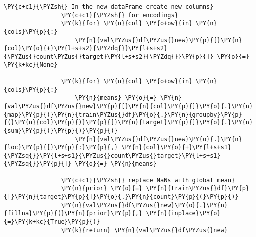 \begin{Verbatim}[commandchars=\\\{\}]
                \PY{c+c1}{\PYZsh{} In the new dataFrame create new columns}
                \PY{c+c1}{\PYZsh{} for encodings}
                \PY{k}{for} \PY{n}{col} \PY{o+ow}{in} \PY{n}{cols}\PY{p}{:}
                    \PY{n}{val\PYZus{}df\PYZus{}new}\PY{p}{[}\PY{n}{col}\PY{o}{+}\PY{l+s+s2}{\PYZdq{}}\PY{l+s+s2}{\PYZus{}count\PYZus{}target}\PY{l+s+s2}{\PYZdq{}}\PY{p}{]} \PY{o}{=} \PY{k+kc}{None}
        
                \PY{k}{for} \PY{n}{col} \PY{o+ow}{in} \PY{n}{cols}\PY{p}{:}
                    \PY{n}{means} \PY{o}{=} \PY{n}{val\PYZus{}df\PYZus{}new}\PY{p}{[}\PY{n}{col}\PY{p}{]}\PY{o}{.}\PY{n}{map}\PY{p}{(}\PY{n}{train\PYZus{}df}\PY{o}{.}\PY{n}{groupby}\PY{p}{(}\PY{n}{col}\PY{p}{)}\PY{p}{[}\PY{n}{target}\PY{p}{]}\PY{o}{.}\PY{n}{sum}\PY{p}{(}\PY{p}{)}\PY{p}{)}
                    \PY{n}{val\PYZus{}df\PYZus{}new}\PY{o}{.}\PY{n}{loc}\PY{p}{[}\PY{p}{:}\PY{p}{,} \PY{n}{col}\PY{o}{+}\PY{l+s+s1}{\PYZsq{}}\PY{l+s+s1}{\PYZus{}count\PYZus{}target}\PY{l+s+s1}{\PYZsq{}}\PY{p}{]} \PY{o}{=} \PY{n}{means}
        
                \PY{c+c1}{\PYZsh{} replace NaNs with global mean}
                \PY{n}{prior} \PY{o}{=} \PY{n}{train\PYZus{}df}\PY{p}{[}\PY{n}{target}\PY{p}{]}\PY{o}{.}\PY{n}{count}\PY{p}{(}\PY{p}{)}
                \PY{n}{val\PYZus{}df\PYZus{}new}\PY{o}{.}\PY{n}{fillna}\PY{p}{(}\PY{n}{prior}\PY{p}{,} \PY{n}{inplace}\PY{o}{=}\PY{k+kc}{True}\PY{p}{)}
                \PY{k}{return} \PY{n}{val\PYZus{}df\PYZus{}new}
\end{Verbatim}




\usepackage{pgfplots}
\usetikzlibrary{patterns}



\usepackage{tikz,ifthen,fp,calc}
\usepackage{caption}
\usepackage{subcaption}
\usetikzlibrary{plotmarks}
\usepackage{graphicx}







\theoremstyle{plain}
\newtheorem{theorem}{Theorem}[section]
\newtheorem{prop}{Proposition}[section]
\newtheorem{corr}{Corollary}[section]
\theoremstyle{definition}
\newtheorem{definition}{Definition}[section]
\newtheorem{lemma}[theorem]{Lemma}
\theoremstyle{definition}
\newtheorem{remark}{Remark}[section]
\newtheorem{fact}{Fact}[section]

\usepackage[english]{babel}
\usepackage{babel,blindtext}
\newtheorem{corollary}{Corollary}[theorem]
\newtheorem{exmp}{Example}[section]
\usepackage{fullpage}
\usepackage{amsfonts}
\usepackage{lscape}
\usepackage{bbm}

